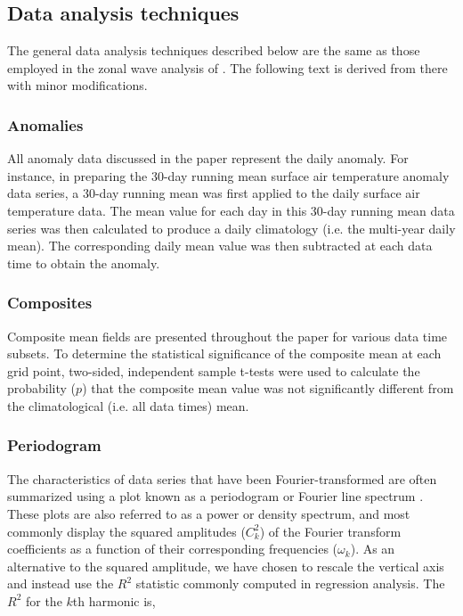 \subsection{Data analysis techniques}

The general data analysis techniques described below are the same as those employed in the zonal wave analysis of \citet{IrvingSimmonds2015}. The following text is derived from there with minor modifications.

\subsubsection{Anomalies}
All anomaly data discussed in the paper represent the daily anomaly. For instance, in preparing the 30-day running mean surface air temperature anomaly data series, a 30-day running mean was first applied to the daily surface air temperature data. The mean value for each day in this 30-day running mean data series was then calculated to produce a daily climatology (i.e. the multi-year daily mean). The corresponding daily mean value was then subtracted at each data time to obtain the anomaly.  

\subsubsection{Composites}
Composite mean fields are presented throughout the paper for various data time subsets. To determine the statistical significance of the composite mean at each grid point, two-sided, independent sample t-tests were used to calculate the probability ($p$) that the composite mean value was not significantly different from the climatological (i.e. all data times) mean.

\subsubsection{Periodogram}

The characteristics of data series that have been Fourier-transformed are often summarized using a plot known as a periodogram or Fourier line spectrum \citep{Wilks2011}. These plots are also referred to as a power or density spectrum, and most commonly display the squared amplitudes ($C_k^2$) of the Fourier transform coefficients as a function of their corresponding frequencies ($\omega_k$). As an alternative to the squared amplitude, we have chosen to rescale the vertical axis and instead use the $R^2$ statistic commonly computed in regression analysis. The $R^2$ for the $k$th harmonic is,

